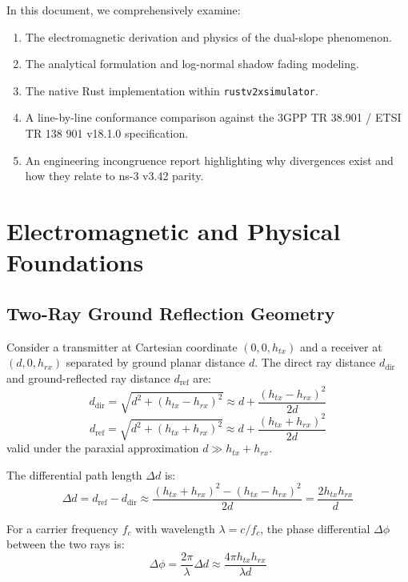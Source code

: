 \documentclass[11pt,a4paper]{article}
\begin{document}
In this document, we comprehensively examine:
\begin{enumerate}
    \item The electromagnetic derivation and physics of the dual-slope phenomenon.
    \item The analytical formulation and log-normal shadow fading modeling.
    \item The native Rust implementation within \texttt{rustv2xsimulator}.
    \item A line-by-line conformance comparison against the 3GPP TR 38.901 / ETSI TR 138 901 v18.1.0 specification.
    \item An engineering incongruence report highlighting why divergences exist and how they relate to ns-3 v3.42 parity.
\end{enumerate}

\section{Electromagnetic and Physical Foundations}

\subsection{Two-Ray Ground Reflection Geometry}
Consider a transmitter at Cartesian coordinate $(0, 0, h_{tx})$ and a receiver at $(d, 0, h_{rx})$ separated by ground planar distance $d$. The direct ray distance $d_{\text{dir}}$ and ground-reflected ray distance $d_{\text{ref}}$ are:
\begin{equation}
d_{\text{dir}} = \sqrt{d^2 + (h_{tx} - h_{rx})^2} \approx d + \frac{(h_{tx} - h_{rx})^2}{2d}
\end{equation}
\begin{equation}
d_{\text{ref}} = \sqrt{d^2 + (h_{tx} + h_{rx})^2} \approx d + \frac{(h_{tx} + h_{rx})^2}{2d}
\end{equation}
valid under the paraxial approximation $d \gg h_{tx} + h_{rx}$.

The differential path length $\Delta d$ is:
\begin{equation}
\Delta d = d_{\text{ref}} - d_{\text{dir}} \approx \frac{(h_{tx} + h_{rx})^2 - (h_{tx} - h_{rx})^2}{2d} = \frac{2 h_{tx} h_{rx}}{d}
\end{equation}

For a carrier frequency $f_c$ with wavelength $\lambda = c / f_c$, the phase differential $\Delta \phi$ between the two rays is:
\begin{equation}
\Delta \phi = \frac{2\pi}{\lambda} \Delta d \approx \frac{4\pi h_{tx} h_{rx}}{\lambda d}
\end{equation}
\end{document}

